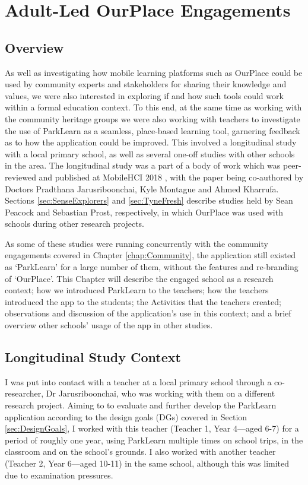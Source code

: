 \chapter{Adult-Led OurPlace Engagements}
\label{chap:Teachers}

\section{Overview}

As well as investigating how mobile learning platforms such as OurPlace could be used by community experts and stakeholders for sharing their knowledge and values, we were also interested in exploring if and how such tools could work within a formal education context. To this end, at the same time as working with the community heritage groups we were also working with teachers to investigate the use of ParkLearn as a seamless, place-based learning tool, garnering feedback as to how the application could be improved. This involved a longitudinal study with a local primary school, as well as several one-off studies with other schools in the area. The longitudinal study was a part of a body of work which was peer-reviewed and published at MobileHCI 2018 \citep{Richardson2018}, with the paper being co-authored by Doctors Pradthana Jarusriboonchai, Kyle Montague and Ahmed Kharrufa. Sections \ref{sec:SenseExplorers} and \ref{sec:TyneFresh} describe studies held by Sean Peacock and Sebastian Prost, respectively, in which OurPlace was used with schools during other research projects.

As some of these studies were running concurrently with the community engagements covered in Chapter \ref{chap:Community}, the application still existed as `ParkLearn' for a large number of them, without the features and re-branding of `OurPlace'. This Chapter will describe the engaged school as a research context; how we introduced ParkLearn to the teachers; how the teachers introduced the app to the students; the Activities that the teachers created; observations and discussion of the application's use in this context; and a brief overview other schools' usage of the app in other studies.

\section{Longitudinal Study Context}
\label{sec:LongitudinalSchool}

I was put into contact with a teacher at a local primary school through a co-researcher, Dr Jarusriboonchai, who was working with them on a different research project. Aiming to to evaluate and further develop the ParkLearn application according to the design goals (DGs) covered in Section \ref{sec:DesignGoals}, I worked with this teacher (Teacher 1, Year 4---aged 6-7) for a period of roughly one year, using ParkLearn multiple times on school trips, in the classroom and on the school's grounds. I also worked with another teacher (Teacher 2, Year 6---aged 10-11) in the same school, although this was limited due to examination pressures. 


